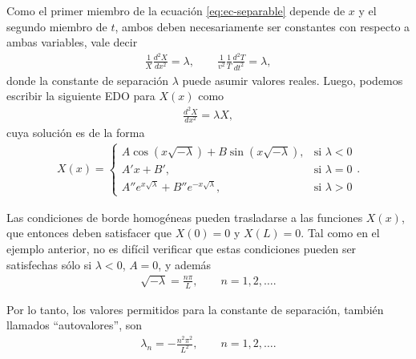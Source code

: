 Como el primer miembro de la ecuación \eqref{eq:ec-separable} depende de $x$ y el segundo miembro de $t$, ambos deben necesariamente ser constantes con respecto a ambas variables, vale decir
\begin{align}
    \frac{1}{X}\frac{d^2 X}{dx^2}=\lambda, \qquad \frac{1}{v^2}\frac{1}{T}\frac{d^2 T}{dt^2}=\lambda,
\end{align}
donde la constante de separación $\lambda$ puede asumir valores reales. Luego, podemos escribir la siguiente EDO para $X(x)$ como
\begin{align}
    \frac{d^2 X}{dx^2}=\lambda X,
\end{align}
cuya solución es de la forma
\begin{align}
    X(x)=
    \begin{cases}
        A \cos(x\sqrt{-\lambda})+B \sin(x\sqrt{-\lambda}), & \text{si }\lambda<0  \\
        A' x+B',                                           & \text{si }\lambda=0  \\
        A'' e^{x\sqrt{\lambda}}+B'' e^{-x\sqrt{\lambda}},  & \text{si }\lambda >0
    \end{cases}.
\end{align}

Las condiciones de borde homogéneas pueden trasladarse a las funciones $X(x)$, que entonces deben satisfacer que $X(0)=0$ y $X(L)=0$.
Tal como en el ejemplo anterior, no es difícil verificar que estas condiciones pueden ser satisfechas sólo si $\lambda < 0$, $A=0$, y además
\begin{align}
    \sqrt{-\lambda}=\frac{n\pi}{L},\qquad n=1,2,\dots.
\end{align}

Por lo tanto, los valores permitidos para la constante de separación, también llamados ``autovalores'', son
\begin{align}\label{LnEO1D}
    \lambda_{n}=-\frac{n^2 \pi^2}{L^2},\qquad n=1,2,\hdots.
\end{align}

